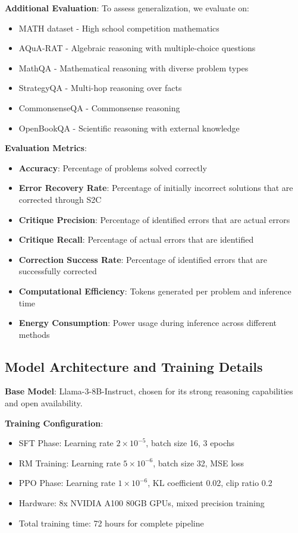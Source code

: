 \documentclass[10pt,twocolumn]{article}
\newcommand{\ssc}{\textsc{S2C}}
\begin{document}
\textbf{Additional Evaluation}: To assess generalization, we evaluate on:
\begin{itemize}
\item MATH dataset - High school competition mathematics
\item AQuA-RAT - Algebraic reasoning with multiple-choice questions
\item MathQA - Mathematical reasoning with diverse problem types
\item StrategyQA - Multi-hop reasoning over facts
\item CommonsenseQA - Commonsense reasoning
\item OpenBookQA - Scientific reasoning with external knowledge
\end{itemize}

\textbf{Evaluation Metrics}:
\begin{itemize}
\item \textbf{Accuracy}: Percentage of problems solved correctly
\item \textbf{Error Recovery Rate}: Percentage of initially incorrect solutions that are corrected through \ssc{}
\item \textbf{Critique Precision}: Percentage of identified errors that are actual errors
\item \textbf{Critique Recall}: Percentage of actual errors that are identified
\item \textbf{Correction Success Rate}: Percentage of identified errors that are successfully corrected
\item \textbf{Computational Efficiency}: Tokens generated per problem and inference time
\item \textbf{Energy Consumption}: Power usage during inference across different methods
\end{itemize}

\subsection{Model Architecture and Training Details}

\textbf{Base Model}: Llama-3-8B-Instruct, chosen for its strong reasoning capabilities and open availability.

\textbf{Training Configuration}:
\begin{itemize}
\item SFT Phase: Learning rate $2 \times 10^{-5}$, batch size 16, 3 epochs
\item RM Training: Learning rate $5 \times 10^{-6}$, batch size 32, MSE loss
\item PPO Phase: Learning rate $1 \times 10^{-6}$, KL coefficient 0.02, clip ratio 0.2
\item Hardware: 8x NVIDIA A100 80GB GPUs, mixed precision training
\item Total training time: 72 hours for complete pipeline
\end{itemize}
\end{document}
